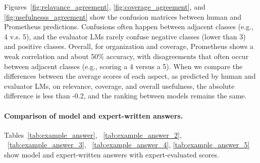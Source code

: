 Figures~\ref{fig:relavance_agreement}, \ref{fig:coverage_agreement}, and \ref{fig:usefulnesss_agreement} show the confusion matrices between human and Prometheus predictions. Confusions often happen between adjacent classes (e.g., 4 v.s. 5), and the evaluator LMs rarely confuse negative classes (lower than 3) and positive classes. 
Overall, for organization and coverage, Prometheus shows a weak correlation and about 50\% accuracy, with disagreements that often occur between adjacent classes (e.g., scoring a 4 versus a 5). 
When we compare the differences between the average scores of each aspect, as predicted by human and evaluator LMs, on relevance, coverage, and overall usefulness, the absolute difference is less than -0.2, and the ranking between models remains the same. 

\paragraph{Comparison of model and expert-written answers.}
Tables~\ref{tab:example_answer}, ~\ref{tab:example_answer_2}, ~\ref{tab:example_answer_3}, ~\ref{tab:example_answer_4}, \ref{tab:example_answer_5} show model and expert-written answers with expert-evaluated scores. 

